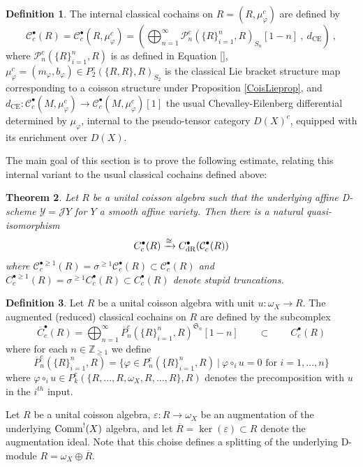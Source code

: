 \documentclass[11pt]{amsart}
\numberwithin{equation}{section}
\newtheorem{theo}{Theorem}[section]
\theoremstyle{definition}
\newtheorem{defn}[theo]{Definition}
\newcommand{\bb}{\mathbb}
\newcommand{\mc}{\mathcal}
\newcommand{\mf}{\mathfrak}
\newcommand{\dR}{{\textup{dR}}}
\newcommand{\Comm}{{\textup{Comm}}}
\newcommand{\Ss}{{{\mf{S}}}}
\newcommand{\0}{{\textbf{0}}}
\newcommand{\DD}{{D}}
\newcommand{\Z}{\bb Z}
\newcommand{\e}{{\varepsilon}}
\def \mf{\mathfrak}
\begin{document}
\begin{defn}\label{intclcodefn}
	The internal classical cochains on $R=(R,\mu_\varphi^c)$ are defined by
	\[\mc C^\bullet_{c}(R)= \mc C^\bullet_{c}(R,\mu_\varphi^c) = \left( \bigoplus_{n=1}^\infty   \mc P_n^c(\{ R\}_{i=1}^n,R)_{S_n}[1-n] \ , \ d_\text{CE} \right)  \ , \]
	where $\mc P_n^c(\{R\}_{i=1}^n,R)$ is as defined in Equation \ref{}, $\mu_\varphi^c=(m_\varphi,b_\varphi)\in P_2^c(\{R,R\},R)_{S_2}$ is the classical Lie bracket structure map corresponding to a coisson structure under Proposition \ref{CoisLieprop}, and $d_\text{CE}:\mc C^\bullet_{c}(M,\mu_\varphi^c)\to \mc C^\bullet_{c}(M,\mu_\varphi^c)[1]$ the usual Chevalley-Eilenberg differential determined by $\mu_\varphi$, internal to the pseudo-tensor category $\DD(X)^c$, equipped with its enrichment over $\DD(X)$.
\end{defn}

The main goal of this section is to prove the following estimate, relating this internal variant to the usual classical cochains defined above:


\begin{theo}\label{clcomptheo} Let $R$ be a unital coisson algebra such that the underlying affine D-scheme $\mc Y=\mc J Y$ for $Y$ a smooth affine variety. Then there is a natural quasi-isomorphism
	\[C_c^{\bullet }(R)  \xrightarrow{\cong}  C_\dR^\bullet( \mc C_c^{\bullet}(R))  \]
	where $\mc C_c^{\bullet\geq 1}(R)=\sigma^{\geq 1} \mc C_c^{\bullet}(R) \subset\mc C_c^{\bullet} (R) $ and  $C_c^{\bullet \geq 1}(R) = \sigma^{ \geq 1}C_c^{\bullet}(R)\subset C_c^{\bullet}(R)$ denote stupid truncations.
\end{theo}


\begin{defn} Let $R$ be a unital coisson algebra with unit $u:\omega_X\to R$. The augmented (reduced) classical cochains on $R$ are defined by the subcomplex
	\[ \overline{C}^\bullet_c(R) = \bigoplus_{n =1}^\infty \overline{P}_{n}^c( \{R\}_{i=1}^{n} , R)^{\Ss_n}[1-n]  \qquad \subset \qquad C^\bullet_c(R) \]
	where for each $n\in \Z_{\geq 1}$ we define
	\[	\overline{P}_{n}^c( \{R\}_{i=1}^{n} ,R) = \{ \varphi \in P_{n}^c( \{R\}_{i=1}^{n} ,R) \ | \ \varphi \circ_i u  = 0 \text{ for $i=1,...,n$} \} \]
	where $\varphi \circ_i u \in P_k^c(\{R,...,R,\omega_X,R,...,R\},R)$ denotes the precomposition with $u$ in the $i^{th}$ input.
\end{defn}




Let $R$ be a unital coisson algebra, $\e:R\to \omega_X$ be an augmentation of the underlying $\Comm^!(X)$ algebra, and let $\overline{R}=\ker(\e)\subset R$ denote the augmentation ideal. Note that this choise defines a splitting of the underlying D-module $R=\omega_X \oplus \overline{R}$.
\end{document}

